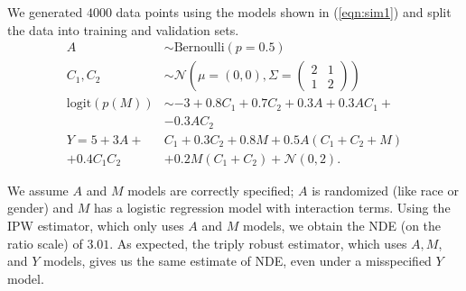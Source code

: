 \documentclass[letterpaper]{article} %
\begin{document}
 We generated $4000$ data points using the models shown in (\ref{eqn:sim1}) and split the data into training and validation sets.  
{\small
\begin{align}
A &\sim \text{Bernoulli}(p = 0.5) \nonumber \\
C_1, C_2 &\sim \mathcal{N}\left(\mu = (0, 0), \Sigma = 
\begin{pmatrix}
  2 & 1 \\ 1 & 2  
 \end{pmatrix} \right)  \nonumber \\
\text{logit}(p(M)) &\sim -3 + 0.8C_1 + 0.7C_2 + 0.3A + 0.3AC_1 + \nonumber \\&
 - 0.3AC_2  \nonumber \\
Y = 5 + 3A + & C_1 + 0.3C_2 + 0.8M +  0.5A(C_1 + C_2 + M)  \nonumber \\
+ 0.4C_1C_2  &+ 0.2M(C_1 + C_2) + \mathcal{N}(0, 2). 
\label{eqn:sim1}
\end{align}
} 

We assume $A$ and $M$ models are correctly specified; $A$ is randomized (like race or gender) and $M$ has a logistic regression model with interaction terms. Using the IPW estimator, which only uses $A$ and $M$ models, we obtain the NDE (on the ratio scale) of $3.01$.  As expected, the triply robust estimator, which uses $A, M$, and $Y$ models,
gives us the same estimate of NDE,  even under a misspecified $Y$ model. 
\end{document}
